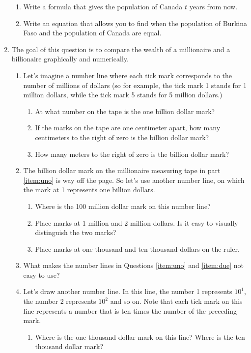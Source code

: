 \documentclass[11pt,dvipsnames]{article}
\begin{document}
\begin{enumerate}[label= {\bf  \arabic*:}]
\begin{enumerate}
	\item Write a formula that gives the population of Canada $t$ years from now.
	\item Write an equation that allows you to find when the population of Burkina Faso and the population of Canada are equal.
\end{enumerate}	
\item The goal of this question is to compare the wealth of a millionaire and a billionaire graphically and numerically.
\begin{enumerate}
	\item \label{item:uno} Let's imagine a number line where each tick mark corresponds to the number of millions of dollars (so for example, the tick mark 1 stands for 1 million dollars, while the tick mark 5 stands for 5 million dollars.) 
	\begin{enumerate}
		\item At what number on the tape is the one billion dollar mark?
		\item If the marks on the tape are one centimeter apart, how many centimeters to the right of zero is the billion dollar mark? 
		\item How many meters to the right of zero is the billion dollar mark?
	\end{enumerate}
	\item \label{item:due} The billion dollar mark on the millionaire measuring tape in part \ref{item:uno} is way off the page. So let's use another number line, on which the mark at 1 represents one billion dollars.
	\begin{enumerate}
		\item Where is the 100 million dollar mark on this number line?
		\item Place marks at 1 million and 2 million dollars. Is it easy to visually distinguish the two marks?
		\item Place marks at one thousand and ten thousand dollars on the ruler.
	\end{enumerate}
	\item What makes the number lines in Questions \ref{item:uno} and \ref{item:due} not easy to use?
	\item Let's draw another number line. In this line, the number 1 represents $\displaystyle 10^1$, the number 2 represents $\displaystyle 10^2$ and so on. Note that each tick mark on this line represents a number that is ten times the number of the preceding mark.
	\begin{enumerate}
		\item Where is the one thousand dollar mark on this line? Where is the ten thousand dollar mark?

\end{enumerate}
\end{enumerate}
\end{enumerate}
\end{document}
